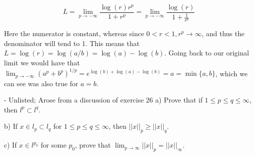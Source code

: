 \begin{solution}
    $$L = \lim_{p \rightarrow -\infty} \frac{\log(r)r^p}{1 + r^p} = \lim_{p \rightarrow -\infty} \frac{\log(r)}{1 + \frac{1}{r^p}}$$

    Here the numerator is constant, whereas since $0 < r < 1, r^p \rightarrow \infty$, and thus the denominator will tend to 1.
    This means that $L = \log(r) = \log(a/b) = \log(a) - \log(b)$.
    Going back to our original limit we would have that $\lim_{p \rightarrow -\infty}(a^p + b^p)^{1/p} = e^{\log(b) + \log(a) - \log(b)} = a = \min\{a, b\}$, which we can see was also true for $a = b$.
\end{solution}

\begin{exercise}{ - Unlisted; Arose from a discussion of exercise 26}
    a) Prove that if $1 \leq p \leq q \leq \infty$, then $l^p \subset l^q$.

    b) If $x \in l_p \subset l_q$ for $1 \leq p \leq q \leq \infty$, then $\lvert \lvert x \rvert \rvert_p \geq \lvert \lvert x \rvert \rvert_q$.

    c) If $x \in l^{p_0}$ for some $p_0$, prove that $\lim_{p \rightarrow \infty} \lvert \lvert x \rvert \rvert_p = \lvert \lvert x \rvert \rvert _\infty$.
\end{exercise}

